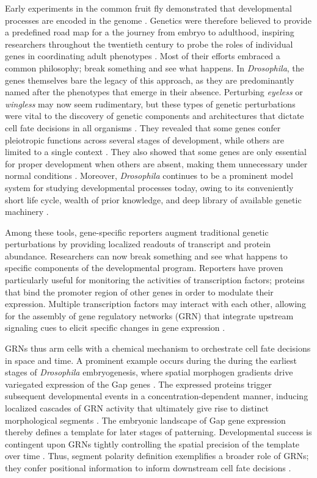 Early experiments in the common fruit fly demonstrated that developmental processes are encoded in the genome \cite{Morgan1915a,Beadle1936}. Genetics were therefore believed to provide a predefined road map for a the journey from embryo to adulthood, inspiring researchers throughout the twentieth century to probe the roles of individual genes in coordinating adult phenotypes \cite{Lewis1978,Nusslein-Volhard1980,Halder1995}. Most of their efforts embraced a common philosophy; break something and see what happens. In \emph{Drosophila}, the genes themselves bare the legacy of this approach, as they are predominantly named after the phenotypes that emerge in their absence. Perturbing \textit{eyeless} or \textit{wingless} may now seem rudimentary, but these types of genetic perturbations were vital to the discovery of genetic components and architectures that dictate cell fate decisions in all organisms \cite{Halder1995,Perrimon1994,Bellen2010}. They revealed that some genes confer pleiotropic functions across several stages of development, while others are limited to a single context \cite{Parody1993a,Perrimon1994,IanSimpson2002a}. They also showed that some genes are only essential for proper development when others are absent, making them unnecessary under normal conditions \cite{Bhanot1999,Pappu2005,Li2005}. Moreover, \emph{Drosophila} continues to be a prominent model system for studying developmental processes today, owing to its conveniently short life cycle, wealth of prior knowledge, and deep library of available genetic machinery \cite{Beira2016,Enomoto2018,Germani2018}.

Among these tools, gene-specific reporters augment traditional genetic perturbations by providing localized readouts of transcript and protein abundance. Researchers can now break something and see what happens to specific components of the developmental program. Reporters have proven particularly useful for monitoring the activities of transcription factors; proteins that bind the promoter region of other genes in order to modulate their expression. Multiple transcription factors may interact with each other, allowing for the assembly of gene regulatory networks (GRN) that integrate upstream signaling cues to elicit specific changes in gene expression \cite{Levine2005,Stathopoulos2005}. 

GRNs thus arm cells with a chemical mechanism to orchestrate cell fate decisions in space and time. A prominent example occurs during the during the earliest stages of \textit{Drosophila} embryogenesis, where spatial morphogen gradients drive variegated expression of the Gap genes \cite{Hulskamp1990,Hulskamp1991}. The expressed proteins trigger subsequent developmental events in a concentration-dependent manner, inducing localized cascades of GRN activity that ultimately give rise to distinct morphological segments \cite{Johnston1992}. The embryonic landscape of Gap gene expression thereby defines a template for later stages of patterning. Developmental success is contingent upon GRNs tightly controlling the spatial precision of the template over time \cite{Perry2011}. Thus, segment polarity definition exemplifies a broader role of GRNs; they confer positional information to inform downstream cell fate decisions \cite{Struhl1993a}.

